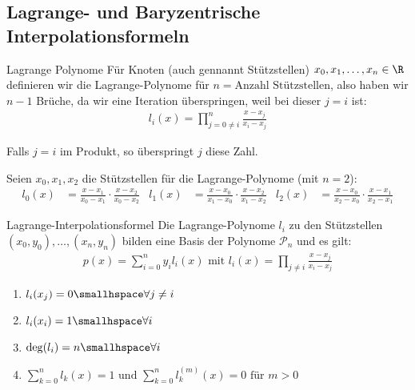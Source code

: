 
\newsection
\subsection{Lagrange- und Baryzentrische Interpolationsformeln}
\label{sec:barycentric-interpolation}

\begin{definition}[]{Lagrange Polynome}
    Für Knoten (auch gennannt Stützstellen) $x_0, x_1, \ldots, x_n \in \R$ definieren wir die Lagrange-Polynome für $n = \text{Anzahl Stützstellen}$, also haben wir $n - 1$ Brüche, da wir eine Iteration überspringen, weil bei dieser $j = i$ ist:
	\begin{align*}
		l_i(x) = \prod_{j = 0 \neq i}^n \frac{x - x_j}{x_i - x_j}
	\end{align*}
\end{definition}
Falls $j = i$ im Produkt, so überspringt $j$ diese Zahl.

\inlineex Seien $x_0, x_1, x_2$ die Stützstellen für die Lagrange-Polynome (mit $n = 2$):
\begin{align*}
	l_0(x) & = \frac{x - x_1}{x_0 - x_1} \cdot \frac{x - x_2}{x_0 - x_2} &
	l_1(x) & = \frac{x - x_0}{x_1 - x_0} \cdot \frac{x - x_2}{x_1 - x_2} &
	l_2(x) & = \frac{x - x_0}{x_2 - x_0} \cdot \frac{x - x_1}{x_2 - x_1}
\end{align*}


\begin{theorem}[]{Lagrange-Interpolationsformel}
	Die Lagrange-Polynome $l_i$ zu den Stützstellen $(x_0, y_0), \ldots, (x_n, y_n)$ bilden eine Basis der Polynome $\mathcal{P}_n$ und es gilt:
	\begin{align*}
		p(x) = \sum_{i = 0}^{n} y_i l_i(x) \text{ mit } l_i(x) = \prod_{j \neq i} \frac{x - x_j}{x_i - x_j}
	\end{align*}
\end{theorem}


\rmvspace
\begin{multicols}{2}
	\begin{enumerate}
		\item $l_i(x_j) = 0 \smallhspace \forall j \neq i$
		\item $l_i(x_i) = 1 \smallhspace \forall i$
		\item $\deg(l_i) = n \smallhspace \forall i$
		\item $\sum_{k = 0}^{n} l_k(x) = 1 \text{ und } \sum_{k = 0}^{n} l_k^{(m)}(x) = 0 \text{ für } m > 0$
	\end{enumerate}
\end{multicols}

